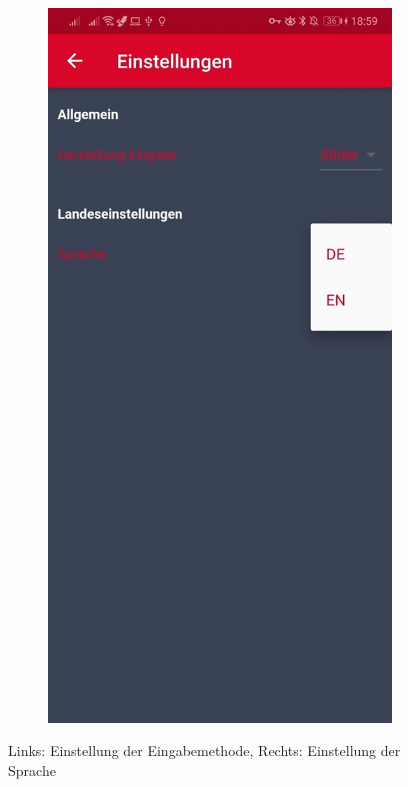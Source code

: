 \begin{figure}[H]
\begin{subfigure}[b]{0.45\textwidth}
		\end{subfigure}
		\hfill
		\begin{subfigure}[b]{0.45\textwidth}
			\includegraphics[width=1\textwidth]{../include/images/settings/settings02}
		\end{subfigure}
		\caption{Links: Einstellung der Eingabemethode, Rechts: Einstellung der Sprache}
		\label{img:settings}
	\end{figure}